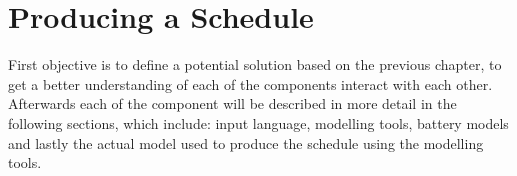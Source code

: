 \chapter{Producing a Schedule} \label{cha:produce}
First objective is to define a potential solution based on the previous chapter, to get a better understanding of each of the components interact with each other. Afterwards each of the component will be described in more detail in the following sections, which include: input language, modelling tools, battery models and lastly the actual model used to produce the schedule using the modelling tools.







%